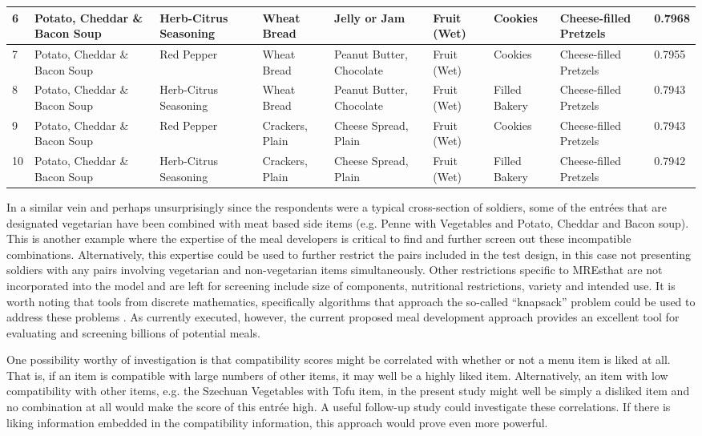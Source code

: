 \begin{landscape}
\begin{longtable}{p{0.5cm}p{4cm}p{4cm}p{2cm}p{2.3cm}p{0.8cm}p{1.5cm}p{2.2cm}p{0.8cm}}
6 & Potato, Cheddar \& Bacon Soup & Herb-Citrus Seasoning & Wheat Bread & Jelly or Jam & Fruit (Wet) & Cookies & Cheese-filled Pretzels & 0.7968\\
\midrule
7 & Potato, Cheddar \& Bacon Soup & Red Pepper & Wheat Bread & Peanut Butter, Chocolate & Fruit (Wet) & Cookies & Cheese-filled Pretzels & 0.7955\\
\midrule
8 & Potato, Cheddar \& Bacon Soup & Herb-Citrus Seasoning & Wheat Bread & Peanut Butter, Chocolate & Fruit (Wet) & Filled Bakery & Cheese-filled Pretzels & 0.7943\\
\midrule
9 & Potato, Cheddar \& Bacon Soup & Red Pepper & Crackers, Plain & Cheese Spread, Plain & Fruit (Wet) & Cookies & Cheese-filled Pretzels & 0.7943\\
\midrule
10 & Potato, Cheddar \& Bacon Soup & Herb-Citrus Seasoning & Crackers, Plain & Cheese Spread, Plain & Fruit (Wet) & Filled Bakery & Cheese-filled Pretzels & 0.7942\\
\end{longtable}
\end{landscape}

In a similar vein and perhaps unsurprisingly since the respondents were a typical cross-section of soldiers, some of the entr\'{e}es that are designated vegetarian have been combined with meat based side items (e.g. Penne with Vegetables and Potato, Cheddar and Bacon soup).  This is another example where the expertise of the meal developers is critical to find and further screen out these incompatible combinations.  Alternatively, this expertise could be used to further restrict the pairs included in the test design, in this case not presenting soldiers with any pairs involving vegetarian and non-vegetarian items simultaneously.  Other restrictions specific to MREs\tm that are not incorporated into the model and are left for screening include size of components, nutritional restrictions, variety  and intended use.  It is worth noting that tools from discrete mathematics, specifically algorithms that approach the so-called “knapsack” problem could be used to address these problems \citep{Martello1990}.  As currently executed, however, the current proposed meal development approach provides an excellent tool for evaluating and screening billions of potential meals.

One possibility worthy of investigation is that compatibility scores  might be correlated with whether or not a menu item is liked at all.  That is, if an item is compatible with large numbers of other items, it may well be a highly liked item.  Alternatively, an item with low compatibility with other items, e.g. the Szechuan Vegetables with Tofu item, in the present study might well be simply a disliked item and no combination at all would make the score of this entr\'{e}e high.  A useful follow-up study could investigate these correlations.  If there is liking information embedded in the compatibility information, this approach would prove even more powerful.

